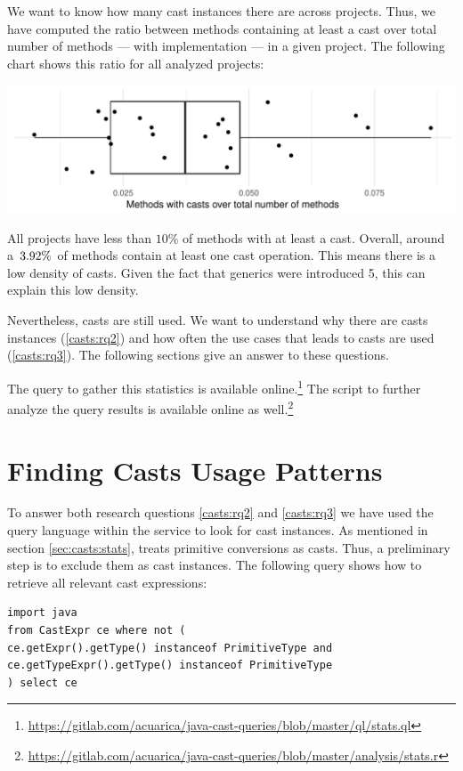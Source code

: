 We want to know how many cast instances there are across projects.
Thus, we have computed the ratio between methods containing at least a cast over total number of methods --- with implementation --- in a given project.
The following chart shows this ratio for all analyzed projects:

\includegraphics[width=\columnwidth]{stats-methodwcast.pdf}

All projects have less than $10\%$ of methods with at least a cast.
Overall, around a~$3.92\%{}$ of methods contain at least one cast operation. 
This means there is a low density of casts.
Given the fact that generics were introduced \java{} 5, this can explain this low density.

Nevertheless, casts are still used.
We want to understand why there are casts instances (\ref{casts:rq2}) and how often the use cases that leads to casts are used (\ref{casts:rq3}).
The following sections give an answer to these questions.

The query to gather this statistics is available online.\footnote{\url{https://gitlab.com/acuarica/java-cast-queries/blob/master/ql/stats.ql}}
The  script to further analyze the query results is available online as well.\footnote{\url{https://gitlab.com/acuarica/java-cast-queries/blob/master/analysis/stats.r}}


\section{Finding Casts Usage Patterns}
\label{sec:casts:methodology}

To answer both research questions \ref{casts:rq2} and \ref{casts:rq3} we have used the \ql{} query language within the \lgtm{} service to look for cast instances.
As mentioned in section \ref{sec:casts:stats}, \ql{} treats primitive conversions as casts.
Thus, a preliminary step is to exclude them as cast instances.
The following \ql{} query shows how to retrieve all relevant cast expressions:

\begin{lstlisting}[style=ql,caption=\ql{} query to retrieve all relevant cast expressions.]
import java
from CastExpr ce where not (
ce.getExpr().getType() instanceof PrimitiveType and
ce.getTypeExpr().getType() instanceof PrimitiveType
) select ce
\end{lstlisting}

